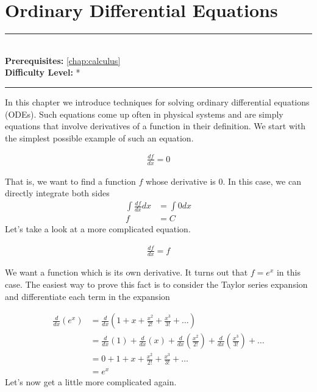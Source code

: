 \documentclass[book.tex]{subfiles}
\begin{document}

\chapter{Ordinary Differential Equations}
\label{chap:ode}
\noindent\rule{11cm}{0.4pt} \\
\textbf{Prerequisites:} \autoref{chap:calculus} \\
\textbf{Difficulty Level:} * \\
\noindent\rule{11cm}{0.4pt}
\vspace{5mm}

In this chapter we introduce techniques for solving ordinary differential equations (ODEs). Such equations come up often in physical systems and are simply equations that involve derivatives of a function in their definition. We start with the simplest possible example of such an equation.

\begin{align}
    \frac{df}{dx} = 0
\end{align}

That is, we want to find a function $f$ whose derivative is 0. In this case, we can directly integrate both sides 
\begin{align}
    \int \frac{df}{dx} dx &= \int 0 dx \\
    f &= C
\end{align}
Let's take a look at a more complicated equation.

\begin{align}
    \frac{df}{dx} = f 
\end{align}

We want a function which is its own derivative. It turns out that $f = e^x$ in this case. The easiest way to prove this fact is to consider the Taylor series expansion and differentiate each term in the expansion

\begin{align}
    \frac{d}{dx}\left (e^x \right ) &= \frac{d}{dx} \left (1 + x + \frac{x^2}{2!} + \frac{x^3}{3!} + \dotsc \right ) \\
    &= \frac{d}{dx} \left ( 1 \right ) + \frac{d}{dx} \left ( x\right ) + \frac{d}{dx} \left ( \frac{x^2}{2!} \right ) + \frac{d}{dx} \left ( \frac{x^3}{3!} \right )+ \dotsc \\
    &= 0 + 1 + x +  \frac{x^2}{2!} + \frac{x^3}{3!} + \dotsc \\
    &= e^x
\end{align}
Let's now get a little more complicated again.
\end{document}
